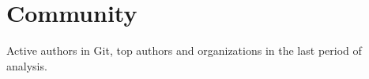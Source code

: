 \chapter{Community}
Active authors in Git, top authors and organizations in the last period of analysis.
